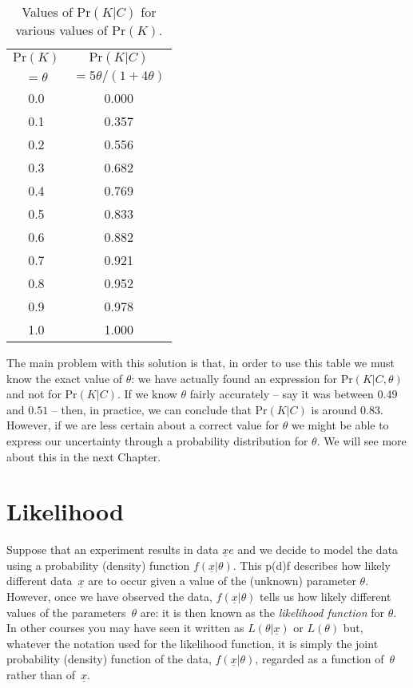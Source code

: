 \begin{table}[h]
\bigskip

\begin{tabular}{|c|c|}
\hline
$\text{Pr}(K)$ & $\text{Pr}(K|C)$ \\
$=\theta$ & $=5\theta/(1+4\theta)$ \\
\hline
0.0 & 0.000 \\
0.1 & 0.357 \\
0.2 & 0.556 \\
0.3 & 0.682 \\
0.4 & 0.769 \\
0.5 & 0.833 \\
0.6 & 0.882 \\
0.7 & 0.921 \\
0.8 & 0.952 \\
0.9 & 0.978 \\
1.0 & 1.000 \\
\hline
\end{tabular}
\caption{Values of $\text{Pr}(K|C)$ for various values of $\text{Pr}(K)$.}
\label{tab:kc}

\end{table}

The main problem with this solution is that, in order to use this
table we must know the exact value of $\theta$: we have actually found
an expression for $\text{Pr}(K|C,\theta)$ and not for $\text{Pr}(K|C)$.  If we know
$\theta$ fairly accurately -- say it was between $0.49$ and $0.51$ --
then, in practice, we can conclude that $\text{Pr}(K|C)$ is around
0.83. However, if we are less certain about a correct value for
$\theta$ we might be able to express our uncertainty through a
probability distribution for $\theta$. We will see more about this in
the next Chapter.

\clearpage

\section{Likelihood}
Suppose that an experiment results in data $\underline{x}e$ and we decide to model the data using a probability (density) function $f(\underline{x}|\theta)$. This p(d)f describes how likely different data~$\underline{x}$ are to occur given a value of the (unknown) parameter $\theta$. However, once we have observed the data, $f(\underline{x}|\theta)$ tells us how likely different values of the parameters~$\theta$ are: it is then known as the \emph{likelihood function} for $\theta$. In other courses you may have seen it written as $L(\theta|\underline{x})$ or $L(\theta)$ but, whatever the notation used for the likelihood function, it is simply the joint probability (density) function of the data, $f(\underline{x}|\theta)$, regarded as a function of~$\theta$ rather than of~$\underline{x}$.

